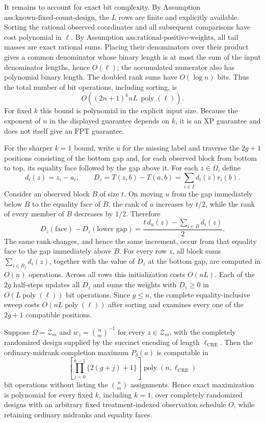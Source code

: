 It remains to account for exact bit complexity.  By
Assumption \(\text{ass:known-fixed-count-design}\), the \(L\) rows are finite
and explicitly available.  Sorting the rational observed coordinates and all
subsequent comparisons have cost polynomial in \(\ell\).  By
Assumption \(\text{ass:rational-positive-weights}\), all tail masses are exact
rational sums.  Placing their denominators over their product gives a common
denominator whose binary length is at most the sum of the input denominator
lengths, hence \(O(\ell)\); the accumulated numerator also has polynomial
binary length.  The doubled rank sums have \(O(\log n)\) bits.  Thus the total
number of bit operations, including sorting, is
\[
 O\!\left((2n+1)^k nL\,\operatorname{poly}(\ell)\right).
\]
For fixed \(k\) this bound is polynomial in the explicit input size.  Because
the exponent of \(n\) in the displayed guarantee depends on \(k\), it is an
\(\mathrm{XP}\) guarantee and does not itself give an \(\mathrm{FPT}\)
guarantee.

For the sharper \(k=1\) bound, write \(u\) for the missing label and traverse
the \(2g+1\) positions consisting of the bottom gap and, for each observed
block from bottom to top, its equality face followed by the gap above it.  For
each \(z\in\Omega\), define
\[
 d_i(z)=z_i-a_i,
 \qquad D_z= T(z,b)-T(a,b)=\sum_{i\in I}d_i(z)r_i(b).
\]
Consider an observed block \(B\) of size \(t\).  On moving \(u\) from the gap
immediately below \(B\) to the equality face of \(B\), the rank of \(u\)
increases by \(t/2\), while the rank of every member of \(B\) decreases by
\(1/2\).  Therefore
\[
 D_z(\text{face})-D_z(\text{lower gap})
 =\frac{t\,d_u(z)-\sum_{i\in B}d_i(z)}{2}.
\]
The same rank changes, and hence the same increment, occur from that equality
face to the gap immediately above \(B\).  For every row \(z\), all block sums
\(\sum_{i\in B_j}d_i(z)\), together with the value of \(D_z\) at the bottom
gap, are computed in \(O(n)\) operations.  Across all rows this initialization
costs \(O(nL)\).  Each of the \(2g\) half-steps updates all \(D_z\) and sums
the weights with \(D_z\ge0\) in \(O(L\operatorname{poly}(\ell))\) bit
operations.  Since \(g\le n\), the complete equality-inclusive sweep costs
\(O(nL\operatorname{poly}(\ell))\) after sorting and examines every one of the
\(2g+1\) compatible positions.

Suppose \(\Omega=\mathcal Z_m\) and
\(w_z=\binom{n}{m}^{-1}\) for every \(z\in\mathcal Z_m\), with the completely
randomized design supplied by the succinct encoding of length
\(\ell_{\mathrm{CRE}}\).  Then the ordinary-midrank completion maximum
\(P_\delta(a)\) is computable in
\[
 \left[\prod_{j=0}^{k-1}\{2(g+j)+1\}\right]
 \operatorname{poly}(n,\ell_{\mathrm{CRE}})
\]
bit operations without listing the \(\binom{n}{m}\) assignments.  Hence exact
maximization is polynomial for every fixed \(k\), including \(k=1\), over
completely randomized designs with an arbitrary fixed treatment-indexed
observation schedule \(O\), while retaining ordinary midranks and equality
faces.

